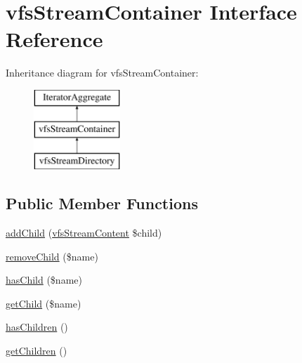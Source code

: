 \hypertarget{interfaceorg_1_1bovigo_1_1vfs_1_1vfs_stream_container}{}\section{vfs\+Stream\+Container Interface Reference}
\label{interfaceorg_1_1bovigo_1_1vfs_1_1vfs_stream_container}
Inheritance diagram for vfs\+Stream\+Container\+:\begin{figure}[H]
\begin{center}
\leavevmode
\includegraphics[height=3.000000cm]{interfaceorg_1_1bovigo_1_1vfs_1_1vfs_stream_container}
\end{center}
\end{figure}
\subsection*{Public Member Functions}
\begin{DoxyCompactItemize}
\item 
\mbox{\hyperlink{interfaceorg_1_1bovigo_1_1vfs_1_1vfs_stream_container_ac6a77daa135cad7077e15b1de57e0d90}{add\+Child}} (\mbox{\hyperlink{interfaceorg_1_1bovigo_1_1vfs_1_1vfs_stream_content}{vfs\+Stream\+Content}} \$child)
\item 
\mbox{\hyperlink{interfaceorg_1_1bovigo_1_1vfs_1_1vfs_stream_container_a2b20c5390cd11395e9a3d32c8c8e51b6}{remove\+Child}} (\$name)
\item 
\mbox{\hyperlink{interfaceorg_1_1bovigo_1_1vfs_1_1vfs_stream_container_a55594af16e4f3167cfd8b6706778eb04}{has\+Child}} (\$name)
\item 
\mbox{\hyperlink{interfaceorg_1_1bovigo_1_1vfs_1_1vfs_stream_container_a1cfdba129d25b04b73af8290f58ba7c1}{get\+Child}} (\$name)
\item 
\mbox{\hyperlink{interfaceorg_1_1bovigo_1_1vfs_1_1vfs_stream_container_a1332d27ba1ecefa899e393e83309735e}{has\+Children}} ()
\item 
\mbox{\hyperlink{interfaceorg_1_1bovigo_1_1vfs_1_1vfs_stream_container_a8650a4f6150ed357d88fa043f1685ac5}{get\+Children}} ()
\end{DoxyCompactItemize}


